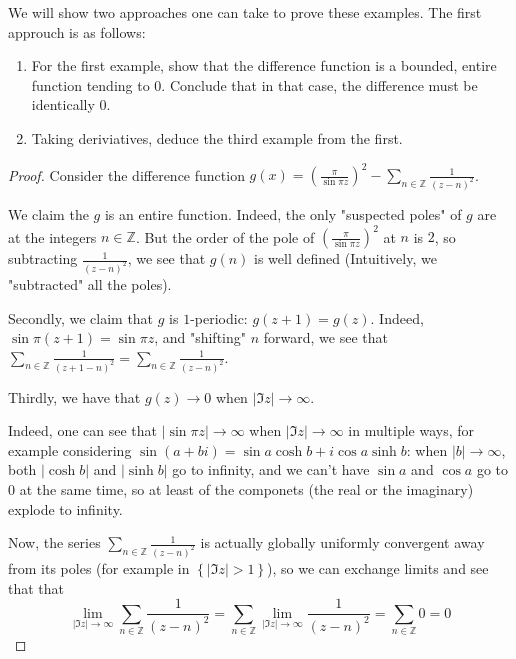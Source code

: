 \documentclass[11pt]{article} %
\theoremstyle{definition}
\newcommand{\abs}[1]{\left|#1\right|}
\begin{document}
We will show two approaches one can take to prove these examples. The first approuch is as follows:

\begin{enumerate}
\item For the first example, show that the difference function is a bounded, entire function tending to $0$. Conclude that in that case, the difference must be identically $0$.
\item Taking deriviatives, deduce the third example from the first.
\end{enumerate}

\begin{proof}
Consider the difference function $g\left(x\right) = \left(\frac{\pi}{\sin\pi z}\right)^2 - \sum_{n\in\mathbb{Z}} \frac{1}{\left(z-n\right)^2}$.

We claim the $g$ is an entire function. Indeed, the only "suspected poles" of $g$ are at the integers $n \in \mathbb{Z}$. But the order of the pole of $\left(\frac{\pi}{\sin\pi z}\right)^2$ at $n$ is $2$, so subtracting $\frac{1}{\left(z-n\right)^2}$, we see that $g\left(n\right)$ is well defined (Intuitively, we "subtracted" all the poles).

Secondly, we claim that $g$ is $1$-periodic: $g\left(z+1\right) = g\left(z\right)$. Indeed, $\sin \pi \left(z + 1\right) = \sin \pi z$, and "shifting" $n$ forward, we see that $\sum_{n\in\mathbb{Z}} \frac{1}{\left(z+1-n\right)^2} = \sum_{n\in\mathbb{Z}}\frac{1}{\left(z-n\right)^2}$.

Thirdly, we have that $g\left(z\right) \to 0$ when $\abs{\Im z} \to \infty$.

Indeed, one can see that $\abs{\sin \pi z} \to \infty$ when $\abs{\Im z} \to \infty$ in multiple ways, for example considering $\sin\left(a + bi\right) = \sin a \cosh b + i \cos a \sinh b$: when $\abs{b} \to \infty$, both $\abs{\cosh b}$ and $\abs{\sinh b}$ go to infinity, and we can't have $\sin a$ and $\cos a$ go to $0$ at the same time, so at least of the componets (the real or the imaginary) explode to infinity.

Now, the series $\sum _{n\in\mathbb{Z}}\frac{1}{\left(z-n\right)^2}$ is actually globally uniformly convergent away from its poles (for example in $\left\{\abs{\Im z} > 1\right\}$), so we can exchange limits and see that that
\[ \lim _{\abs{\Im z} \to \infty}\sum _{n\in \mathbb{Z}} \frac{1}{\left(z-n\right)^2} = \sum_{n\in \mathbb{Z}} \lim_{\abs{\Im z} \to \infty} \frac{1}{\left(z-n\right)^2} = \sum_{n\in\mathbb{Z}} 0 = 0\]


\end{proof}
\end{document}
